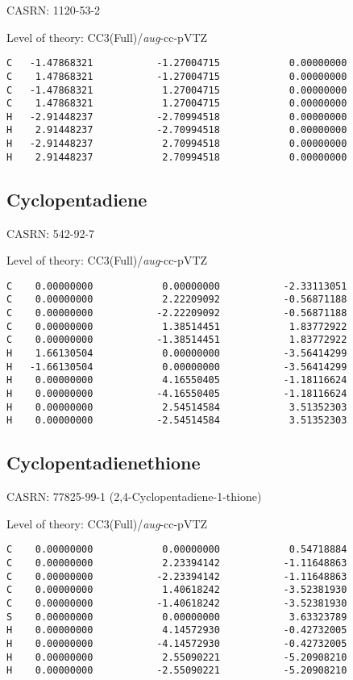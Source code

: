 \documentclass[journal=jctcce,manuscript=article,layout=traditional]{achemso}
\newcommand{\AVTZ}{\emph{aug}-cc-pVTZ}
\begin{document}
CASRN: 1120-53-2

\begin{singlespace}
\noindent Level of theory: CC3(Full)/{\AVTZ}
\begin{verbatim}
C   -1.47868321           -1.27004715            0.00000000
C    1.47868321           -1.27004715            0.00000000
C   -1.47868321            1.27004715            0.00000000
C    1.47868321            1.27004715            0.00000000
H   -2.91448237           -2.70994518            0.00000000
H    2.91448237           -2.70994518            0.00000000
H   -2.91448237            2.70994518            0.00000000
H    2.91448237            2.70994518            0.00000000
\end{verbatim}
\end{singlespace}

\subsection{Cyclopentadiene}

CASRN: 542-92-7

\begin{singlespace}
\noindent Level of theory: CC3(Full)/{\AVTZ}
\begin{verbatim}
C    0.00000000            0.00000000           -2.33113051
C    0.00000000            2.22209092           -0.56871188
C    0.00000000           -2.22209092           -0.56871188
C    0.00000000            1.38514451            1.83772922
C    0.00000000           -1.38514451            1.83772922
H    1.66130504            0.00000000           -3.56414299
H   -1.66130504            0.00000000           -3.56414299
H    0.00000000            4.16550405           -1.18116624
H    0.00000000           -4.16550405           -1.18116624
H    0.00000000            2.54514584            3.51352303
H    0.00000000           -2.54514584            3.51352303
\end{verbatim}
\end{singlespace}

\subsection{Cyclopentadienethione}

CASRN: 77825-99-1 (2,4-Cyclopentadiene-1-thione)

\begin{singlespace}
\noindent Level of theory: CC3(Full)/{\AVTZ}
\begin{verbatim}
C    0.00000000            0.00000000            0.54718884
C    0.00000000            2.23394142           -1.11648863
C    0.00000000           -2.23394142           -1.11648863
C    0.00000000            1.40618242           -3.52381930
C    0.00000000           -1.40618242           -3.52381930
S    0.00000000            0.00000000            3.63323789
H    0.00000000            4.14572930           -0.42732005 
H    0.00000000           -4.14572930           -0.42732005 
H    0.00000000            2.55090221           -5.20908210
H    0.00000000           -2.55090221           -5.20908210
\end{verbatim}
\end{singlespace}
\end{document}

